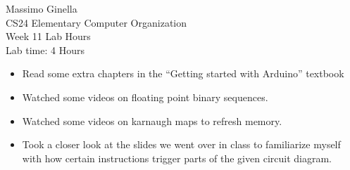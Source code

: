 \documentclass[12pt]{article}
\begin{document}
	\begin{center}
		Massimo Ginella \\
		CS24 Elementary Computer Organization \\
		Week 11 Lab Hours \\
		Lab time: 4 Hours \vspace{0.5cm} \\
	\end{center}
	
	\begin{itemize}
		\item Read some extra chapters in the ``Getting started with Arduino'' textbook
		\item Watched some videos on floating point binary sequences.
		\item Watched some videos on karnaugh maps to refresh memory.
		\item Took a closer look at the slides we went over in class to familiarize myself with how certain instructions trigger parts of the given circuit diagram.
	\end{itemize}
	
	
	
\end{document}
